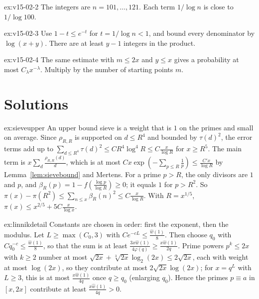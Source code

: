 \begin{hint}{ex:v15-02-2}
The integers are \(n=101,\dots,121\). Each term \(1/\log n\) is close to \(1/\log100\).
\end{hint}

\begin{hint}{ex:v15-02-3}
Use \(1-t\le e^{-t}\) for \(t=1/\log n<1\), and bound every denominator by \(\log(x+y)\). There are at least \(y-1\) integers in the product.
\end{hint}

\begin{hint}{ex:v15-02-4}
The same estimate with \(m\le2x\) and \(y\le x\) gives a probability at most \(C_{\lambda}x^{-\lambda}\). Multiply by the number of starting points \(m\).
\end{hint}

\section{Solutions}

\begin{solution}{ex:sieveupper}
\idea An upper bound sieve is a weight that is $1$ on the primes and small on average.
\writeup Since $\rho_{R,R}$ is supported on $d\le R^4$ and bounded by $\tau(d)^2$, the error terms add up to $\sum_{d\le R^4}\tau(d)^2\le CR^4\log^4R\le C\frac x{\log R}$ for $x\ge R^5$. The main term is $x\sum_d\frac{\rho_{R,R}(d)}d$, which is at most $Cx\exp(-\sum_{p\le R}\frac1p)\le\frac{C'x}{\log R}$ by Lemma~\ref{lem:sievebound} and Mertens. For a prime $p>R$, the only divisors are $1$ and $p$, and $\beta_R(p)=1-f(\frac{\log p}{\log R})\ge0$; it equals $1$ for $p>R^2$. So $\pi(x)-\pi(R^2)\le\sum_{n\le x}\beta_R(n)^2\le C\frac x{\log R}$. With $R=x^{1/5}$, $\pi(x)\le x^{2/5}+5C\frac x{\log x}$.
\end{solution}

\begin{solution}{ex:linnikdetail}
\idea Constants are chosen in order: first the exponent, then the modulus.
\writeup Let $L\ge\max(C_0,3)$ with $Ce^{-cL}\le\frac{\hat w(1)}8$. Then choose $q_0$ with $Cq_0^{-c}\le\frac{\hat w(1)}8$, so that the sum is at least $\frac{3x\hat w(1)}{4\varphi(q)}\ge\frac{x\hat w(1)}{2q}$. Prime powers $p^k\le2x$ with $k\ge2$ number at most $\sqrt{2x}+\sqrt[3]{2x}\log_2(2x)\le2\sqrt{2x}$, each with weight at most $\log(2x)$, so they contribute at most $2\sqrt{2x}\log(2x)$; for $x=q^L$ with $L\ge3$, this is at most $\frac{x\hat w(1)}{4q}$ once $q\ge q_0$ (enlarging $q_0$). Hence the primes $p\equiv a$ in $[x,2x]$ contribute at least $\frac{x\hat w(1)}{4q}>0$.
\end{solution}

